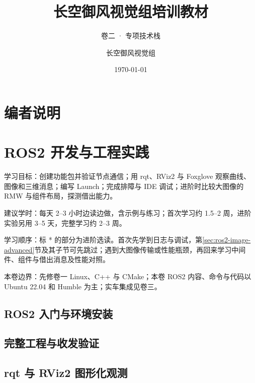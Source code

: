 \documentclass[
  lang=cn,
  scheme=chinese,
  chinesefont=ctexfont,
  11pt,
  oneside,
  device=normal,
  color=cyan,
  mode=fancy
]{elegantbook}
\title{长空御风视觉组培训教材}
\subtitle{卷二 · 专项技术栈}
\author{长空御风视觉组}
\institute{视觉组培训}
\date{\today}
\begin{document}
\maketitle

\frontmatter

\chapter*{编者说明}


\tableofcontents

\mainmatter

\chapter{ROS2 开发与工程实践}

\begin{introduction}
  \item 学习目标：创建功能包并验证节点通信；用 rqt、RViz2 与 Foxglove 观察曲线、图像和三维消息；编写 Launch；完成排障与 IDE 调试；进阶时比较大图像的 RMW 与组件布局，探测借出能力。
  \item 建议学时：每天 2--3 小时边读边做，含示例与练习；首次学习约 1.5--2 周，进阶实验另用 3--5 天，完整学习约 2--3 周。
  \columnbreak
  \item 学习顺序：标 * 的部分为进阶选读。首次先学到日志与调试，第\ref{sec:ros2-image-advanced}节及其子节可先跳过；遇到大图像传输或性能瓶颈，再回来学习中间件、组件与借出消息及性能对照。
  \item 本卷边界：先修卷一 Linux、C++ 与 CMake；本卷 ROS2 内容、命令与代码以 Ubuntu 22.04 和 Humble 为主；实车集成见卷三。
\end{introduction}

\section{ROS2 入门与环境安装}


\section{完整工程与收发验证}

\section{rqt 与 RViz2 图形化观测}

\end{document}
